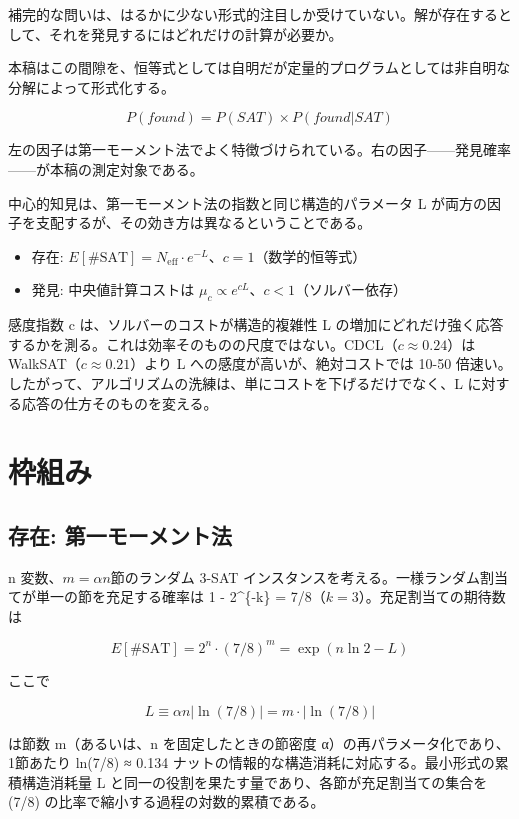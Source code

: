 \documentclass[12pt,a4paper]{article}
\begin{document}
補完的な問いは、はるかに少ない形式的注目しか受けていない。解が存在するとして、それを発見するにはどれだけの計算が必要か。

本稿はこの間隙を、恒等式としては自明だが定量的プログラムとしては非自明な分解によって形式化する。

\[
P(found) = P(SAT) \times P(found|SAT)
\]

左の因子は第一モーメント法でよく特徴づけられている。右の因子------発見確率------が本稿の測定対象である。

中心的知見は、第一モーメント法の指数と同じ構造的パラメータ L が両方の因子を支配するが、その効き方は異なるということである。

\begin{itemize}
\tightlist
\item
  存在: \(E[\#\text{SAT}] = N_{\text{eff}} \cdot e^{-L}\)、\(c = 1\)（数学的恒等式）
\item
  発見: 中央値計算コストは \(\mu_c \propto e^{cL}\)、\(c < 1\)（ソルバー依存）
\end{itemize}

感度指数 c は、ソルバーのコストが構造的複雑性 L の増加にどれだけ強く応答するかを測る。これは効率そのものの尺度ではない。CDCL（\(c ≈ 0.24\)）は WalkSAT（\(c ≈ 0.21\)）より L への感度が高いが、絶対コストでは 10-50 倍速い。したがって、アルゴリズムの洗練は、単にコストを下げるだけでなく、L に対する応答の仕方そのものを変える。

\section{枠組み}\label{ux67a0ux7d44ux307f}

\subsection{存在: 第一モーメント法}\label{ux5b58ux5728-ux7b2cux4e00ux30e2ux30fcux30e1ux30f3ux30c8ux6cd5}

n 変数、\(m = \alpha n\)節のランダム 3-SAT インスタンスを考える。一様ランダム割当てが単一の節を充足する確率は 1 - 2\^{}\{-k\} = 7/8（\(k = 3\)）。充足割当ての期待数は

\[
E[\#\text{SAT}] = 2^n \cdot (7/8)^m = \exp(n \ln 2 - L)
\]

ここで

\[
L ≡ \alpha n|\ln(7/8)| = m · |\ln(7/8)|
\]

は節数 m（あるいは、n を固定したときの節密度 α）の再パラメータ化であり、1節あたり \textbar ln(7/8)\textbar{} ≈ 0.134 ナットの情報的な構造消耗に対応する。最小形式の累積構造消耗量 L と同一の役割を果たす量であり、各節が充足割当ての集合を (7/8) の比率で縮小する過程の対数的累積である。
\end{document}
